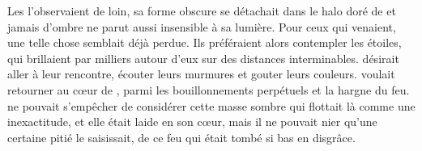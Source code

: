 Les \Ea l'observaient de loin, sa forme obscure se détachait dans le halo doré de \Naos et jamais d'ombre ne parut aussi insensible à sa lumière. Pour ceux qui venaient, une telle chose semblait déjà perdue. Ils préféraient alors contempler les étoiles, qui brillaient par milliers autour d'eux sur des distances interminables. \Nio désirait aller à leur rencontre, écouter leurs murmures et gouter leurs couleurs. \Fercor voulait retourner au cœur de \Naos, parmi les bouillonnements perpétuels et la hargne  du feu. \Oros ne pouvait s'empêcher de considérer cette masse sombre qui flottait là comme une inexactitude, et elle était laide en son cœur, mais il ne pouvait nier qu'une certaine pitié le saisissait, de ce feu qui était tombé si bas en disgrâce.         





